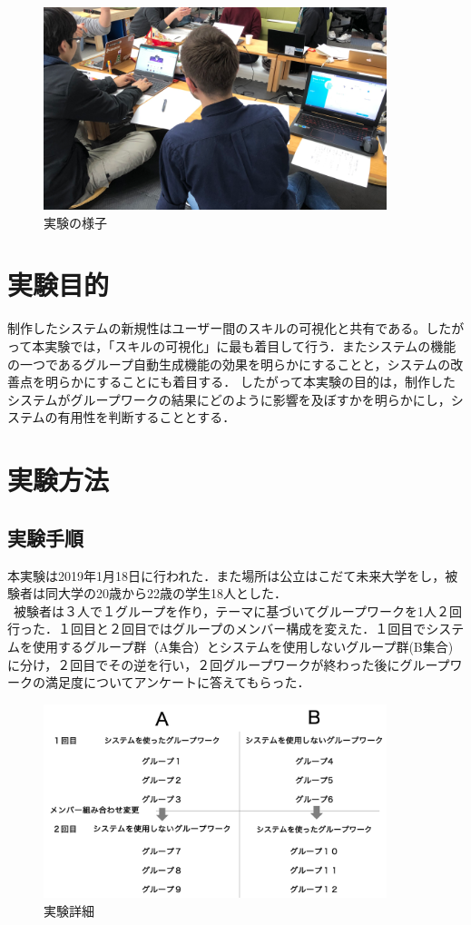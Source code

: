 \documentclass{funthesis}
\begin{document}
\begin{figure}[h]
 \centering
   \includegraphics[width=100mm]{figures/zikkennyousu.png}
 \caption{実験の様子}
 \label{auto}
\end{figure}


\section{実験目的}
制作したシステムの新規性はユーザー間のスキルの可視化と共有である。したがって本実験では，「スキルの可視化」に最も着目して行う．またシステムの機能の一つであるグループ自動生成機能の効果を明らかにすることと，システムの改善点を明らかにすることにも着目する．
したがって本実験の目的は，制作したシステムがグループワークの結果にどのように影響を及ぼすかを明らかにし，システムの有用性を判断することとする．
\section{実験方法}
\subsection{実験手順}
本実験は2019年1月18日に行われた．また場所は公立はこだて未来大学をし，被験者は同大学の20歳から22歳の学生18人とした．\\
\ 被験者は３人で１グループを作り，テーマに基づいてグループワークを1人２回行った．１回目と２回目ではグループのメンバー構成を変えた．１回目でシステムを使用するグループ群（A集合）とシステムを使用しないグループ群(B集合)に分け，２回目でその逆を行い，２回グループワークが終わった後にグループワークの満足度についてアンケートに答えてもらった．

\begin{figure}[h]
 \centering
   \includegraphics[width=100mm]{figures/zikken1.png}
 \caption{実験詳細}
 \label{zikken1}
\end{figure}
\end{document}

